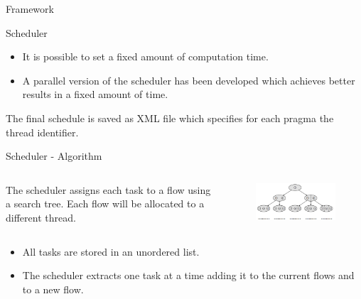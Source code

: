 \documentclass[xcolor=dvipsnames]{beamer}
\begin{document}
\begin{section}{Framework}
\begin{frame}{\hskip 0.3cm Scheduler }
\begin{itemize}
\item It is possible to set a fixed amount of computation time.

\item A parallel version of the scheduler has been developed which achieves better results in a fixed amount of time.

\end{itemize}

The final schedule is saved as XML file which specifies for each pragma the thread identifier.

\end{frame}







\begin{frame}{\hskip 0.3cm Scheduler - Algorithm}
\vskip -0.9cm
\begin{columns}

\begin{column}{6cm}

The scheduler assigns each task to a flow using a search tree. Each flow will be allocated to a different thread.

\end{column}

\begin{column}{4.5cm}

\begin{figure}
\centering
\includegraphics[scale=0.37]{search_tree.png}
\end{figure}
\end{column}


\end{columns}

\begin{itemize}

\item All tasks are stored in an unordered list.

\item The scheduler extracts one task at a time adding it to the current flows and to a new flow.


\end{itemize}
\end{frame}
\end{section}
\end{document}
